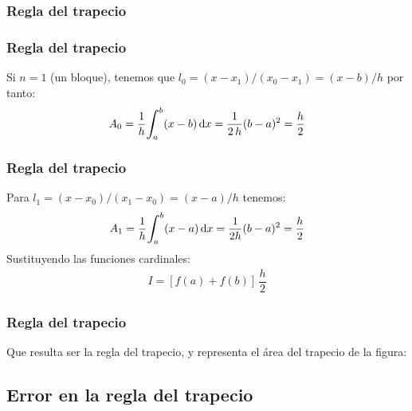\documentclass[12pt]{beamer}
\begin{document}
\begin{frame}
\frametitle{Regla del trapecio}
\begin{figure}
	\centering
	
\end{figure}
\end{frame}
\begin{frame}
\frametitle{Regla del trapecio}
Si $n = 1$ (un bloque), \pause tenemos que $l_{0} = (x - x_{1})/(x_{0} - x_{1})= (x - b)/h$ por tanto:
\pause
\begin{align*}
A_{0} = \dfrac{1}{h} \scaleint{6ex}_{\bs a}^{b} (x - b) \dd{x} = \dfrac{1}{2 \, h} (b - a)^{2} = \dfrac{h}{2}
\end{align*}
\end{frame}
\begin{frame}
\frametitle{Regla del trapecio}
Para $l_{1} = (x - x_{0})/(x_{1} - x_{0}) = (x - a)/h$ tenemos:
\pause
\begin{align*}
A_{1} = \dfrac{1}{h} \scaleint{6ex}_{\bs a}^{b} (x - a) \dd{x} = \dfrac{1}{2h} (b-a)^{2}= \dfrac{h}{2}
\end{align*}
Sustituyendo las funciones cardinales:
\pause
\begin{align*}
I = \left[ f (a) + f (b) \right] \, \dfrac{h}{2}
\end{align*}
\end{frame}
\begin{frame}
\frametitle{Regla del trapecio}
Que resulta ser la regla del trapecio, y representa el área del trapecio de la figura:
\begin{figure}
	\centering
	
\end{figure}
\end{frame}

\subsection{Error en la regla del trapecio}
\end{document}
